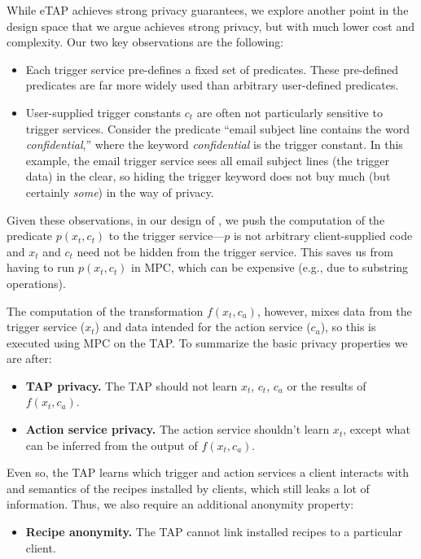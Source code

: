 While \textsf{eTAP} achieves strong privacy guarantees, we explore another point
in the design space that we argue achieves strong privacy, but with much lower
cost and complexity. Our two key observations are the following:
\begin{itemize}
  \item Each trigger service pre-defines a fixed set of predicates. These
    pre-defined predicates are far more widely used than arbitrary user-defined
    predicates.
  \item User-supplied trigger constants $c_t$ are often not particularly
    sensitive to trigger services. Consider the predicate ``email subject line
    contains the word \emph{confidential},'' where the keyword
    \emph{confidential} is the trigger constant. In this example, the email
    trigger service sees all email subject lines (the trigger data) in the
    clear, so hiding the trigger keyword does not buy much (but certainly
    \emph{some}) in the way of privacy.
\end{itemize}
Given these observations, in our design of \sys, we push the computation of the
predicate $p(x_t, c_t)$ to the trigger service---$p$ is not arbitrary
client-supplied code and $x_t$ and $c_t$ need not be hidden from the trigger
service. This saves us from having to run $p(x_t, c_t)$ in MPC, which can be
expensive (e.g., due to substring operations).

The computation of the transformation $f(x_t, c_a)$, however, mixes data from
the trigger service ($x_t$) and data intended for the action service ($c_a$), so
this is executed using MPC on the TAP. To summarize the basic privacy properties
we are after:
\begin{itemize}
  \item \textbf{TAP privacy.} The TAP should not learn $x_t$, $c_t$, $c_a$ or
    the results of $f(x_t, c_a)$.
  \item \textbf{Action service privacy.} The action service shouldn't learn
    $x_t$, except what can be inferred from the output of $f(x_t, c_a)$.
\end{itemize}
Even so, the TAP learns which trigger and action services a client interacts
with and semantics of the recipes installed by clients, which still leaks a lot of
information.  Thus, we also require an additional anonymity property:
\begin{itemize}
  \item \textbf{Recipe anonymity.} The TAP cannot link installed recipes to a
    particular client.
\end{itemize}


